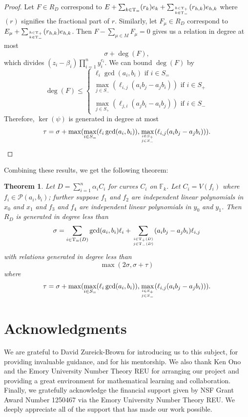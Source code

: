 \documentclass{amsart}
\theoremstyle{plain}
\newtheorem{thm}{Theorem}[section]
\theoremstyle{definition}
\theoremstyle{remark}
\numberwithin{equation}{section}
\newcommand\bida{a}
\newcommand\bidb{b}
\newcommand\hirz{\mathbb{F}}
\DeclareMathOperator{\Te}{T_=}
\DeclareMathOperator{\Tp}{T_+}
\DeclareMathOperator{\Tm}{T_-}
\begin{document}
\begin{proof}
Let $F\in R_D$ correspond to $E + \sum_{k\in \Te} (r_k) e_k + \sum_{h\in \Tp \atop k\in \Tm} (r_{h,k}) e_{h,k}$ where $(r)$ signifies the fractional part of $r$.  Similarly, let $F_\mu \in R_D$ correspond to $E_\mu + \sum_{h\in \Tp \atop k\in \Tm} (r_{h,k}) e_{h,k}$.  Then $F - \sum_{\mu\in M} F_\mu = 0$ gives us a relation in degree at most
\[
	\sigma + \deg(F),
\]
which divides $(z_i - \beta_i) \prod_{i=1}^n y_i^{c_i}$.
We can bound $\deg(F)$ by
\[
	\deg(F) \le \left\{ \begin{split}  \ell_i \gcd(\bida_i, \bidb_i) \mbox{ if } i \in S_= 
			\\ \max_{j\in S_-}(\ell_{i,j} (\bida_i \bidb_
j - \bida_j \bidb_i)) \mbox{ if } i\in S_+ \\
			\\ \max_{j\in S_+}(\ell_{j, i} (\bida_j \bidb_
i - \bida_i \bidb_j)) \mbox{ if } i \in S_- \end{split}  \right.
\]
Therefore, $\ker(\psi)$ is generated in degree at most
\[
	\tau = \sigma
	+ \max( \max_{i\in S_=}(\ell_i \gcd(a_i, b_i)), \max_{i\in S_+ \atop j\in S_-}(\ell_{i,j} (\bida_i \bidb_j - \bida_j \bidb_i))).
\]
\end{proof}

Combining these results, we get the following theorem:

\begin{thm}\label{Hirzebruch-generators/relations}
Let $D = \sum_{i=1}^n \alpha_i C_i$ for curves $C_i$ on $\hirz_k$.  Let $C_i = V(f_i)$ where $f_i \in \mathscr{P}(a_i, b_i)$; further suppose $f_1$ and $f_2$ are independent linear
polynomials in $x_0$ and $x_1$ and $f_3$ and $f_4$ are independent
linear polynomials in $y_0$ and $y_1$.
Then $R_D$ is generated in degree less than 
\[
	\sigma = \sum_{i\in \Te(D)} \gcd(\bida_i, \bidb_i)\ell_i + \sum_{i\in \Tp(D) \atop
	j \in \Tm(D)} (\bida_i \bidb_j- \bida_j \bidb_i)\ell_{i,j}
\]
with relations generated in degree less than 
\[
	\max(2 \sigma, \sigma + \tau)
\]
where
\[
	\tau = \sigma
	+ \max( \max_{i\in S_=}(\ell_i \gcd(a_i, b_i)), \max_{i\in S_+ \atop j\in S_-}(\ell_{i,j} (\bida_i \bidb_j - \bida_j \bidb_i))).
\]
\end{thm}



\section{Acknowledgments}
We are grateful to David Zureick-Brown for introducing us to this
subject, for providing invaluable guidance,
and for his mentorship. We also thank Ken Ono and the
Emory University Number Theory REU for arranging our project and
providing a great environment for mathematical learning and
collaboration.
Finally, we gratefully acknowledge the financial support given by
NSF Grant Award Number 1250467 via the Emory University Number
Theory REU. We deeply appreciate all of the support that has made
our work possible.


\nocite{*}
{}

\end{document}
